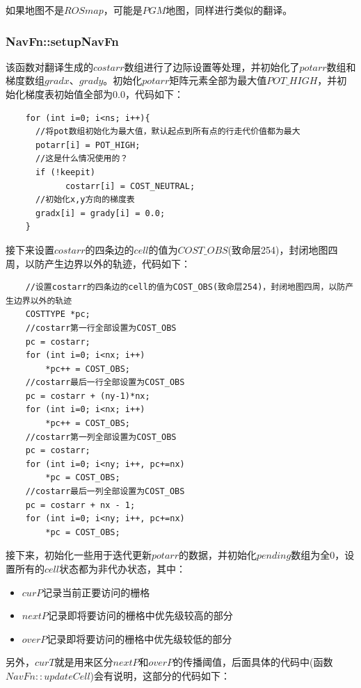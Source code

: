 \documentclass[9pt, oneside]{book}
\begin{document}
如果地图不是$ROS map$，可能是$PGM$地图，同样进行类似的翻译。

\subsubsection{NavFn::setupNavFn}

该函数对翻译生成的$costarr$数组进行了边际设置等处理，并初始化了$potarr$数组和梯度数组$gradx$、$grady$。初始化$potarr$矩阵元素全部为最大值$POT\_HIGH$，并初始化梯度表初始值全部为0.0，代码如下：

\begin{verbatim}
    for (int i=0; i<ns; i++){
      //将pot数组初始化为最大值，默认起点到所有点的行走代价值都为最大
      potarr[i] = POT_HIGH;
      //这是什么情况使用的？
      if (!keepit) 
            costarr[i] = COST_NEUTRAL;
      //初始化x,y方向的梯度表
      gradx[i] = grady[i] = 0.0;
    }
\end{verbatim}

接下来设置$costarr$的四条边的$cell$的值为$COST\_OBS$(致命层254)，封闭地图四周，以防产生边界以外的轨迹，代码如下：

\small
\begin{verbatim}
    //设置costarr的四条边的cell的值为COST_OBS(致命层254)，封闭地图四周，以防产生边界以外的轨迹
    COSTTYPE *pc;
    //costarr第一行全部设置为COST_OBS
    pc = costarr;
    for (int i=0; i<nx; i++)
        *pc++ = COST_OBS;
    //costarr最后一行全部设置为COST_OBS
    pc = costarr + (ny-1)*nx;
    for (int i=0; i<nx; i++)
        *pc++ = COST_OBS;
    //costarr第一列全部设置为COST_OBS
    pc = costarr;
    for (int i=0; i<ny; i++, pc+=nx)
        *pc = COST_OBS;
    //costarr最后一列全部设置为COST_OBS
    pc = costarr + nx - 1;
    for (int i=0; i<ny; i++, pc+=nx)
        *pc = COST_OBS;
\end{verbatim}
\normalsize

接下来，初始化一些用于迭代更新$potarr$的数据，并初始化$pending$数组为全0，设置所有的$cell$状态都为非代办状态，其中：

\begin{itemize}
    \item $curP$记录当前正要访问的栅格
    \item $nextP$记录即将要访问的栅格中优先级较高的部分
    \item $overP$记录即将要访问的栅格中优先级较低的部分
\end{itemize}

另外，$curT$就是用来区分$nextP$和$overP$的传播阈值，后面具体的代码中(函数$NavFn::updateCell$)会有说明，这部分的代码如下：
\end{document}
